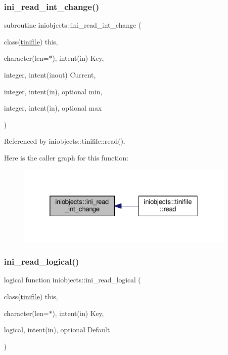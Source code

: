 \subsubsection{\texorpdfstring{ini\+\_\+read\+\_\+int\+\_\+change()}{ini\_read\_int\_change()}}
{\footnotesize\ttfamily subroutine iniobjects\+::ini\+\_\+read\+\_\+int\+\_\+change (\begin{DoxyParamCaption}\item[{class(\mbox{\hyperlink{structiniobjects_1_1tinifile}{tinifile}})}]{this,  }\item[{character(len=$\ast$), intent(in)}]{Key,  }\item[{integer, intent(inout)}]{Current,  }\item[{integer, intent(in), optional}]{min,  }\item[{integer, intent(in), optional}]{max }\end{DoxyParamCaption})\hspace{0.3cm}{\ttfamily [private]}}



Referenced by iniobjects\+::tinifile\+::read().

Here is the caller graph for this function\+:
\nopagebreak
\begin{figure}[H]
\begin{center}
\leavevmode
\includegraphics[width=304pt]{namespaceiniobjects_a67f08b5a06f2f74225f692955a712320_icgraph}
\end{center}
\end{figure}
\mbox{\label{namespaceiniobjects_a5eb68a820a33b02e0b7edec1bcf632f3}} 
\subsubsection{\texorpdfstring{ini\+\_\+read\+\_\+logical()}{ini\_read\_logical()}}
{\footnotesize\ttfamily logical function iniobjects\+::ini\+\_\+read\+\_\+logical (\begin{DoxyParamCaption}\item[{class(\mbox{\hyperlink{structiniobjects_1_1tinifile}{tinifile}})}]{this,  }\item[{character(len=$\ast$), intent(in)}]{Key,  }\item[{logical, intent(in), optional}]{Default }\end{DoxyParamCaption})\hspace{0.3cm}{\ttfamily [private]}}

